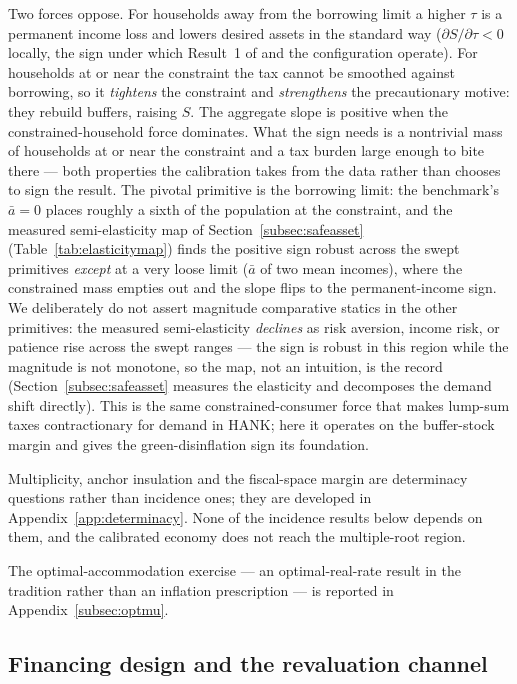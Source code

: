 \documentclass[12pt]{article}
\newcommand{\Sfun}{S}
\begin{document}
Two forces oppose. For households away from the borrowing limit a
higher $\tau$ is a permanent income loss and lowers desired assets in the
standard way ($\partial\Sfun/\partial\tau<0$ locally, the sign under which
Result~1 of \citet{hagedorn2026dtpl} and the
\citet{angeletos2024deficits} configuration operate). For households at or near the constraint the tax cannot be smoothed
against borrowing, so it \emph{tightens} the constraint and \emph{strengthens}
the precautionary motive: they rebuild buffers, raising $\Sfun$. The
aggregate slope is positive when the constrained-household force dominates.
What the sign needs is a nontrivial mass of households at or near the
constraint and a tax burden large enough to bite there --- both properties
the calibration takes from the data rather than chooses to sign the result.
The pivotal primitive is the borrowing limit: the benchmark's $\bar a=0$
places roughly a sixth of the population at the constraint, and the measured
semi-elasticity map of Section~\ref{subsec:safeasset}
(Table~\ref{tab:elasticitymap}) finds the positive sign robust across the
swept primitives \emph{except} at a very loose limit ($\bar a$ of two mean
incomes), where the constrained mass empties out and the slope flips to the
permanent-income sign. We deliberately do not assert magnitude comparative
statics in the other primitives: the measured semi-elasticity \emph{declines}
as risk aversion, income risk, or patience rise across the swept ranges ---
the sign is robust in this region while the magnitude is not monotone, so
the map, not an intuition, is the record
(Section~\ref{subsec:safeasset} measures the elasticity and decomposes the
demand shift directly). This is
the same constrained-consumer force that makes lump-sum taxes contractionary
for demand in HANK; here it operates on the buffer-stock margin and gives the
green-disinflation sign its foundation.

Multiplicity, anchor insulation and the fiscal-space margin are determinacy questions rather than incidence ones; they are developed in Appendix~\ref{app:determinacy}. None of the incidence results below depends on them, and the calibrated economy does not reach the multiple-root region.

The optimal-accommodation exercise --- an optimal-real-rate result in the \citet{aiyagarimcgrattan1998} tradition rather than an inflation prescription --- is reported in Appendix~\ref{subsec:optmu}.

\subsection{Financing design and the revaluation channel}\label{subsec:financingdesign}
\end{document}

